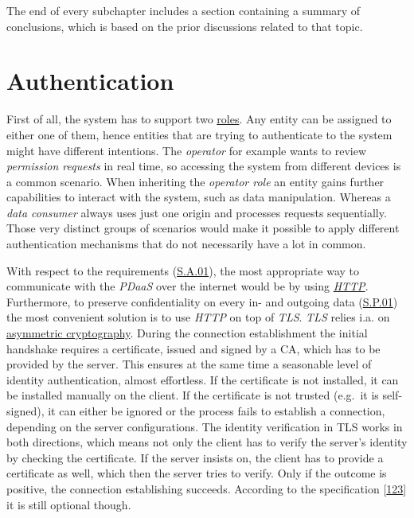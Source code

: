 \documentclass[12pt,english,a4paper,titlepage,cleardoublepage=empty,dottedtoc]{report}
\begin{document}
The end of every subchapter includes a section containing a summary of
conclusions, which is based on the prior discussions related to that
topic.

\hypertarget{authentication}{\section{Authentication}\label{authentication}}

First of all, the system has to support two
\protect\hyperlink{sa03}{roles}. Any entity can be assigned to either
one of them, hence entities that are trying to authenticate to the
system might have different intentions. The \emph{operator} for example
wants to review \emph{permission requests} in real time, so accessing
the system from different devices is a common scenario. When inheriting
the \emph{operator role} an entity gains further capabilities to
interact with the system, such as data manipulation. Whereas a
\emph{data consumer} always uses just one origin and processes requests
sequentially. Those very distinct groups of scenarios would make it
possible to apply different authentication mechanisms that do not
necessarily have a lot in common.

With respect to the requirements (\protect\hyperlink{sa01}{S.A.01}), the
most appropriate way to communicate with the \emph{PDaaS} over the
internet would be by using \emph{\protect\hyperlink{link_http}{HTTP}}.
Furthermore, to preserve confidentiality on every in- and outgoing data
(\protect\hyperlink{sp01}{S.P.01}) the most convenient solution is to
use \emph{HTTP} on top of \emph{TLS}. \emph{TLS} relies i.a. on
\protect\hyperlink{link_asym-crypto}{asymmetric cryptography}. During
the connection establishment the initial handshake requires a
certificate, issued and signed by a CA, which has to be provided by the
server. This ensures at the same time a seasonable level of identity
authentication, almost effortless. If the certificate is not installed,
it can be installed manually on the client. If the certificate is not
trusted (e.g.~it is self-signed), it can either be ignored or the
process fails to establish a connection, depending on the server
configurations. The identity verification in TLS works in both
directions, which means not only the client has to verify the server's
identity by checking the certificate. If the server insists on, the
client has to provide a certificate as well, which then the server tries
to verify. Only if the outcome is positive, the connection establishing
succeeds. According to the specification
{[}\protect\hyperlink{ref-web_spec_tls-12_client-auth}{123}{]} it is
still optional though.
\end{document}
